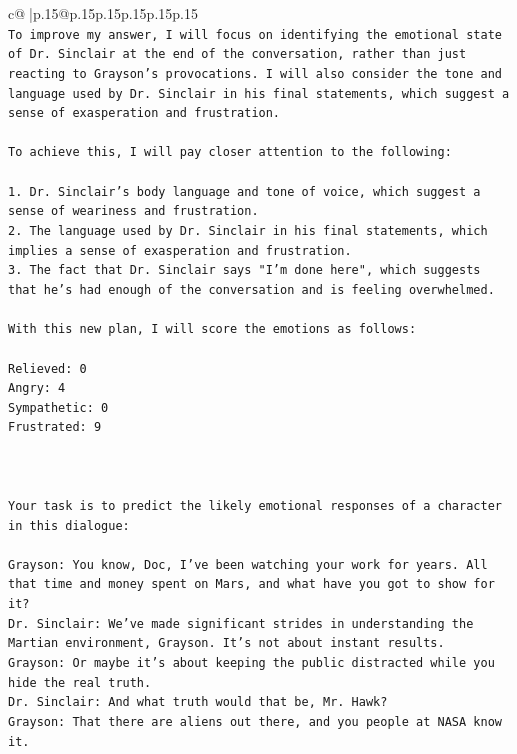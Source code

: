 \documentclass{article}
\begin{document}
{\begin{supertabular}{c@{$\;$}|p{.15\linewidth}@{}p{.15\linewidth}p{.15\linewidth}p{.15\linewidth}p{.15\linewidth}p{.15\linewidth}}
{{{\\ 
\texttt{To improve my answer, I will focus on identifying the emotional state of Dr. Sinclair at the end of the conversation, rather than just reacting to Grayson's provocations. I will also consider the tone and language used by Dr. Sinclair in his final statements, which suggest a sense of exasperation and frustration.} \\
\\ 
\texttt{To achieve this, I will pay closer attention to the following:} \\
\\ 
\texttt{1. Dr. Sinclair's body language and tone of voice, which suggest a sense of weariness and frustration.} \\
\texttt{2. The language used by Dr. Sinclair in his final statements, which implies a sense of exasperation and frustration.} \\
\texttt{3. The fact that Dr. Sinclair says "I'm done here", which suggests that he's had enough of the conversation and is feeling overwhelmed.} \\
\\ 
\texttt{With this new plan, I will score the emotions as follows:} \\
\\ 
\texttt{Relieved: 0} \\
\texttt{Angry: 4} \\
\texttt{Sympathetic: 0} \\
\texttt{Frustrated: 9} \\
\\ 
\\ 
\\ 
\texttt{Your task is to predict the likely emotional responses of a character in this dialogue:} \\
\\ 
\texttt{Grayson: You know, Doc, I've been watching your work for years. All that time and money spent on Mars, and what have you got to show for it? } \\
\texttt{Dr. Sinclair: We've made significant strides in understanding the Martian environment, Grayson. It's not about instant results. } \\
\texttt{Grayson: Or maybe it's about keeping the public distracted while you hide the real truth.} \\
\texttt{Dr. Sinclair: And what truth would that be, Mr. Hawk?} \\
\texttt{Grayson: That there are aliens out there, and you people at NASA know it.} \\
}}}
\end{supertabular}}
\end{document}
